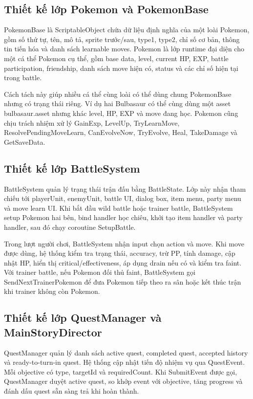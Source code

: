 \subsection{Thiết kế lớp Pokemon và PokemonBase}

PokemonBase là ScriptableObject chứa dữ liệu định nghĩa của một loài Pokemon, gồm số thứ tự, tên, mô tả, sprite trước/sau, type1, type2, chỉ số cơ bản, thông tin tiến hóa và danh sách learnable moves. Pokemon là lớp runtime đại diện cho một cá thể Pokemon cụ thể, gồm base data, level, current HP, EXP, battle participation, friendship, danh sách move hiện có, status và các chỉ số hiện tại trong battle.

Cách tách này giúp nhiều cá thể cùng loài có thể dùng chung PokemonBase nhưng có trạng thái riêng. Ví dụ hai Bulbasaur có thể cùng dùng một asset bulbasaur.asset nhưng khác level, HP, EXP và move đang học. Pokemon cũng chịu trách nhiệm xử lý GainExp, LevelUp, TryLearnMove, ResolvePendingMoveLearn, CanEvolveNow, TryEvolve, Heal, TakeDamage và GetSaveData.

\subsection{Thiết kế lớp BattleSystem}

BattleSystem quản lý trạng thái trận đấu bằng BattleState. Lớp này nhận tham chiếu tới playerUnit, enemyUnit, battle UI, dialog box, item menu, party menu và move learn UI. Khi bắt đầu wild battle hoặc trainer battle, BattleSystem setup Pokemon hai bên, bind handler học chiêu, khởi tạo item handler và party handler, sau đó chạy coroutine SetupBattle.

Trong lượt người chơi, BattleSystem nhận input chọn action và move. Khi move được dùng, hệ thống kiểm tra trạng thái, accuracy, trừ PP, tính damage, cập nhật HP, hiển thị critical/effectiveness, áp dụng drain nếu có và kiểm tra faint. Với trainer battle, nếu Pokemon đối thủ faint, BattleSystem gọi SendNextTrainerPokemon để đưa Pokemon tiếp theo ra sân hoặc kết thúc trận khi trainer không còn Pokemon.

\subsection{Thiết kế lớp QuestManager và MainStoryDirector}

QuestManager quản lý danh sách active quest, completed quest, accepted history và ready-to-turn-in quest. Hệ thống cập nhật tiến độ nhiệm vụ qua QuestEvent. Mỗi objective có type, targetId và requiredCount. Khi SubmitEvent được gọi, QuestManager duyệt active quest, so khớp event với objective, tăng progress và đánh dấu quest sẵn sàng trả khi hoàn thành.

